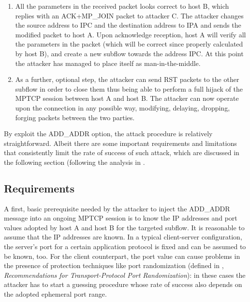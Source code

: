 \begin{enumerate}
\item All the parameters in the received packet looks correct to host B, which replies with an ACK+MP\_JOIN packet to attacker C. The attacker changes the source address to IPC and the destination address to IPA and sends the modified packet to host A. Upon acknowledge reception, host A will verify all the parameters in the packet (which will be correct since properly calculated by host B), and create a new subflow towards the address IPC. At this point the attacker has managed to place itself as man-in-the-middle.

\item As a further, optional step, the attacker can send RST packets to the other subflow in order to close them thus being able to perform a full hijack of the MPTCP session between host A and host B. The attacker can now operate upon the connection in any possible way, modifying, delaying, dropping, forging packets between the two parties.
\end{enumerate}

By exploit the ADD\_ADDR option, the attack procedure is relatively straightforward. Albeit there are some important requirements and limitations that consistently limit the rate of success of such attack, which are discussed in the following section (following the analysis in .

\subsection{Requirements}
A first, basic prerequisite needed by the attacker to inject the ADD\_ADDR message into an ongoing MPTCP session is to know the IP addresses and port values adopted by host A and host B for the targeted subflow. It is reasonable to assume that the IP addresses are known. In a typical client-server configuration, the server's port for a certain application protocol is fixed and can be assumed to be known, too. For the client counterpart, the port value can cause problems in the presence of protection techniques like port randomization (defined in , \textit{Recommendations for Transport-Protocol Port Randomization}): in these cases the attacker has to start a guessing procedure whose rate of success also depends on the adopted ephemeral port range.

